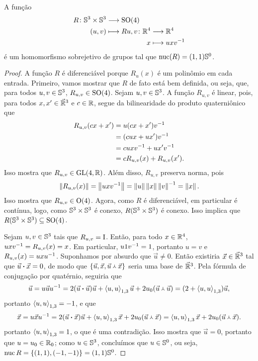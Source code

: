 \begin{definition}
A função
	\begin{align*}
	\func{R}{\S^3 \times \S^3}{\SO(4)}{(u,v)}{
		\begin{aligned}[t]
		\func{R{u,v}}{\R^4}{\R^4}{x}{uxv\inv}
		\end{aligned}
	}
	\end{align*}
é um homomorfismo sobrejetivo de grupos tal que $\nuc(R) = (1,1)\S^0$.
\end{definition}
\begin{proof}
A função $R$ é diferenciável porque $R_u(x)$ é um polinômio em cada entrada. Primeiro, vamos mostrar que $R$ de fato está bem definida, ou seja, que, para todos $u,v \in \S^3$, $R_{u,v} \in \SO(4)$. Sejam $u,v \in \S^3$. A função $R_{u,v}$ é linear, pois, para todos $x,x' \in \vec{\R}^3$ e $c \in \R$, segue da bilinearidade do produto quaterniônico que
	\begin{align*}
	R_{u,v}(cx+x') &= u(cx+x')v\inv \\
		&= (cux+ux')v\inv \\
		&= cuxv\inv + ux'v\inv \\
		&= cR_{u,v}(x) + R_{u,v}(x').
	\end{align*}
Isso mostra que $R_{u,v} \in \GL(4,\R)$. Além disso, $R_{u,v}$ preserva norma, pois
	\begin{equation*}
	\nor{R_{u,v}(x)} = \nor{uxv\inv} = \nor{u}\nor{x}\nor{v}\inv = \nor{x}.
	\end{equation*}
Isso mostra que $R_{u,v} \in \GO(4)$. Agora, como $R$ é diferenciável, em particular é contínua, logo, como $\S^3 \times \S^3$ é conexo, $R(\S^3 \times \S^3)$ é conexo. Isso implica que $R(\S^3 \times \S^3) \subseteq \SO(4)$.

Sejam $u,v \in \S^3$ tais que $R_{u,v} = \Id$. Então, para todo $x \in \R^4$, $uxv\inv = R_{u,v}(x) = x$. Em particular, $u1v\inv = 1$, portanto $u=v$ e $R_{u,v}(x) = uxu\inv$. Suponhamos por absurdo que $\vec{u} \neq 0$. Então existiria $\vec{x} \in \vec{\R}^3$ tal que $\pesc{\vec{u}}{\vec{x}} = 0$, de modo que $\{\vec{u},\vec{x},\pvec{\vec{u}}{\vec{x}}\}$ seria uma base de $\vec{\R}^3$. Pela fórmula de conjugação por quatérnio, seguiria que
	\begin{equation*}
	\vec{u} = u\vec{u}u\inv = 2(\pesc{\vec{u}}{\vec{u}})\vec{u} + \inteq{u}{u}\vec{u} + 2 \esc{u}(\pvec{\vec{u}}{\vec{u}}) = (2+\inteq{u}{u})\vec{u},
	\end{equation*}
portanto $\inteq{u}{u} = -1$, e que
	\begin{equation*}
	\vec{x} = u\vec{x}u\inv = 2(\pesc{\vec{u}}{\vec{x}})\vec{u} + \inteq{u}{u}\vec{x} + 2 \esc{u}(\pvec{\vec{u}}{\vec{x}}) = \inteq{u}{u}\vec{x} + 2\esc{u}(\pvec{\vec{u}}{\vec{x}}).
	\end{equation*}
portanto $\inteq{u}{u}=1$, o que é uma contradição. Isso mostra que $\vec{u} = 0$, portanto que $u = \esc{u} \in \esc{\R}$; como $u \in \S^3$, concluímos que $u \in \S^0$, ou seja, $\nuc{R} = \{(1,1),(-1,-1)\} = (1,1)\S^0$.


\end{proof}

